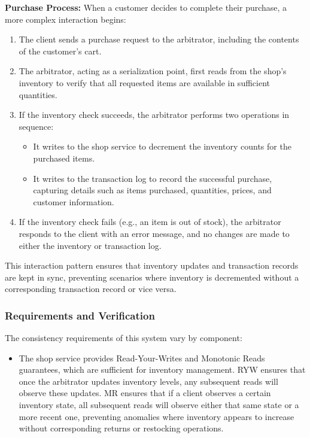 {  \textbf{Purchase Process:} When a customer decides to complete their
  purchase, a more complex interaction begins:

  \begin{enumerate}
    \item The client sends a purchase request to the arbitrator,
      including the contents of the customer's cart.

    \item The arbitrator, acting as a serialization point, first reads
      from the shop's inventory to verify that all requested items are
      available in sufficient quantities.

    \item If the inventory check succeeds, the arbitrator performs two
      operations in sequence:
      \begin{itemize}
        \item It writes to the shop service to decrement the inventory
          counts for the purchased items.
        \item It writes to the transaction log to record the successful
          purchase, capturing details such as items purchased,
          quantities, prices, and customer information.
      \end{itemize}

    \item If the inventory check fails (e.g., an item is out of stock),
      the arbitrator responds to the client with an error message, and
      no changes are made to either the inventory or transaction log.
  \end{enumerate}

  This interaction pattern ensures that inventory updates and
  transaction records are kept in sync, preventing scenarios where
  inventory is decremented without a corresponding transaction record
  or vice versa.

  \subsubsection{Requirements and Verification}

  The consistency requirements of this system vary by component:

  \begin{itemize}
    \item The shop service provides Read-Your-Writes and Monotonic
      Reads guarantees, which are sufficient for inventory management.
      RYW ensures that once the arbitrator updates inventory levels,
      any subsequent reads will observe these updates. MR ensures that
      if a client observes a certain inventory state, all subsequent
      reads will observe either that same state or a more recent one,
      preventing anomalies where inventory appears to increase without
      corresponding returns or restocking operations.


\end{itemize}}
